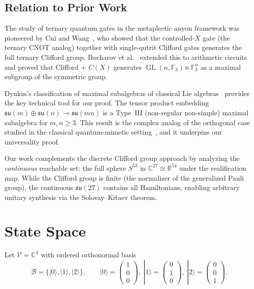 \documentclass[12pt,a4paper]{article}
\newcommand{\GL}{\operatorname{GL}}
\begin{document}
\subsection{Relation to Prior Work}

The study of ternary quantum gates in the metaplectic anyon framework
was pioneered by Cui and Wang~\cite{cuietal2015}, who showed that the
controlled-$X$ gate (the ternary CNOT analog) together with single-qutrit
Clifford gates generates the full ternary Clifford group. Bocharov
et al.~\cite{bocharov2016improved} extended this to arithmetic circuits
and proved that Clifford $+$ $C(X)$ generates $\GL(n, \mathbb{F}_3) \ltimes
\mathbb{F}_3^n$ as a maximal subgroup of the symmetric group.

Dynkin's classification of maximal subalgebras of classical Lie
algebras~\cite{dynkin1952} provides the key technical tool for our
proof. The tensor product embedding $\mathfrak{su}(m) \oplus
\mathfrak{su}(n) \to \mathfrak{su}(mn)$ is a Type~III (non-regular
non-simple) maximal subalgebra for $m,n \ge 3$. This result is the
complex analog of the orthogonal case studied in the classical
quantum-mimetic setting~\cite{quantummimetic}, and it underpins our
universality proof.

Our work complements the discrete Clifford group approach by analyzing
the \emph{continuous} reachable set: the full sphere $S^{53}$ in
$\mathbb{C}^{27} \cong \mathbb{R}^{54}$ under the realification map.
While the Clifford group is finite (the normalizer of the generalized
Pauli group), the continuous $\mathfrak{su}(27)$ contains all
Hamiltonians, enabling arbitrary unitary synthesis via the
Solovay--Kitaev theorem.

\section{State Space}

Let $\mathcal{V} = \mathbb{C}^3$ with ordered orthonormal basis
\[
\mathcal{B} = \{|0\rangle, |1\rangle, |2\rangle\},\qquad
|0\rangle = \begin{pmatrix}1\\0\\0\end{pmatrix},\;
|1\rangle = \begin{pmatrix}0\\1\\0\end{pmatrix},\;
|2\rangle = \begin{pmatrix}0\\0\\1\end{pmatrix}.
\]
\end{document}
